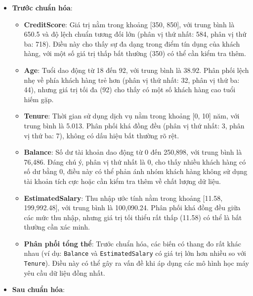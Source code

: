 \documentclass[
]{article}
\providecommand{\tightlist}{%
  \setlength{\itemsep}{0pt}\setlength{\parskip}{0pt}}
\begin{document}
\begin{itemize}
\tightlist
\item
  \textbf{Trước chuẩn hóa}:

  \begin{itemize}
  \tightlist
  \item
    \textbf{CreditScore}: Giá trị nằm trong khoảng {[}350, 850{]}, với
    trung bình là 650.5 và độ lệch chuẩn tương đối lớn (phân vị thứ
    nhất: 584, phân vị thứ ba: 718). Điều này cho thấy sự đa dạng trong
    điểm tín dụng của khách hàng, với một số giá trị thấp bất thường
    (350) có thể cần kiểm tra thêm.
  \item
    \textbf{Age}: Tuổi dao động từ 18 đến 92, với trung bình là 38.92.
    Phân phối lệch nhẹ về phía khách hàng trẻ hơn (phân vị thứ nhất: 32,
    phân vị thứ ba: 44), nhưng giá trị tối đa (92) cho thấy có một số
    khách hàng cao tuổi hiếm gặp.
  \item
    \textbf{Tenure}: Thời gian sử dụng dịch vụ nằm trong khoảng {[}0,
    10{]} năm, với trung bình là 5.013. Phân phối khá đồng đều (phân vị
    thứ nhất: 3, phân vị thứ ba: 7), không có dấu hiệu bất thường rõ
    rệt.
  \item
    \textbf{Balance}: Số dư tài khoản dao động từ 0 đến 250,898, với
    trung bình là 76,486. Đáng chú ý, phân vị thứ nhất là 0, cho thấy
    nhiều khách hàng có số dư bằng 0, điều này có thể phản ánh nhóm
    khách hàng không sử dụng tài khoản tích cực hoặc cần kiểm tra thêm
    về chất lượng dữ liệu.
  \item
    \textbf{EstimatedSalary}: Thu nhập ước tính nằm trong khoảng
    {[}11.58, 199,992.48{]}, với trung bình là 100,090.24. Phân phối khá
    đồng đều giữa các mức thu nhập, nhưng giá trị tối thiểu rất thấp
    (11.58) có thể là bất thường cần xác minh.
  \item
    \textbf{Phân phối tổng thể}: Trước chuẩn hóa, các biến có thang đo
    rất khác nhau (ví dụ: \texttt{Balance} và \texttt{EstimatedSalary}
    có giá trị lớn hơn nhiều so với \texttt{Tenure}). Điều này có thể
    gây ra vấn đề khi áp dụng các mô hình học máy yêu cầu dữ liệu đồng
    nhất.
  \end{itemize}
\item
  \textbf{Sau chuẩn hóa}:


\end{itemize}
\end{document}
